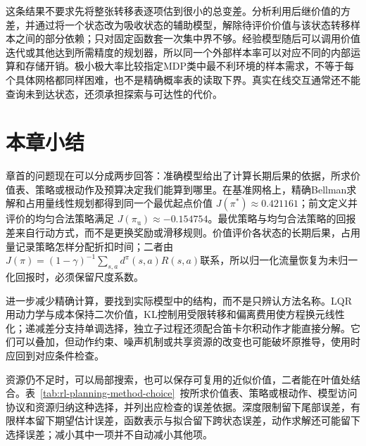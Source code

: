 这条结果不要求先将整张转移表逐项估到很小的总变差。分析利用后继价值的方差，并通过将一个状态改为吸收状态的辅助模型，解除待评价价值与该状态转移样本之间的部分依赖；只对固定函数套一次集中界不够。经验模型随后可以调用价值迭代或其他达到所需精度的规划器，所以同一个外部样本率可以对应不同的内部运算和存储开销。极小极大率比较指定MDP类中最不利环境的样本需求，不等于每个具体网格都同样困难，也不是精确概率表的读取下界。真实在线交互通常还不能查询未到达状态，还须承担探索与可达性的代价。

\section{本章小结}
\label{sec:rl-planning-summary}

章首的问题现在可以分成两步回答：准确模型给出了计算长期后果的依据，所求价值表、策略或根动作及预算决定我们能算到哪里。在基准网格上，精确Bellman求解和占用量线性规划都得到同一个最优起点价值
$J(\pi^*)\approx0.421161$；前文定义并评价的均匀合法策略满足
$J(\pi_{\mathrm u})\approx-0.154754$。最优策略与均匀合法策略的回报差来自行动方式，而不是更换奖励或滑移规则。价值评价各状态的长期后果，占用量记录策略怎样分配折扣时间；二者由
$J(\pi)=(1-\gamma)^{-1}\sum_{s,a}d^\pi(s,a)R(s,a)$联系，所以归一化流量恢复为未归一化回报时，必须保留尺度系数。

进一步减少精确计算，要找到实际模型中的结构，而不是只辨认方法名称。LQR用动力学与成本保持二次价值，KL控制用受限转移和偏离费用使方程换元线性化；递减差分支持单调选择，独立子过程还须配合笛卡尔积动作才能直接分解。它们可以叠加，但动作约束、噪声机制或共享资源的改变也可能破坏原推导，使用时应回到对应条件检查。

资源仍不足时，可以局部搜索，也可以保存可复用的近似价值，二者能在叶值处结合。表~\ref{tab:rl-planning-method-choice}~按所求价值表、策略或根动作、模型访问协议和资源归纳这种选择，并列出应检查的误差依据。深度限制留下尾部误差，有限样本留下期望估计误差，函数表示与拟合留下跨状态误差，动作求解还可能留下选择误差；减小其中一项并不自动减小其他项。

